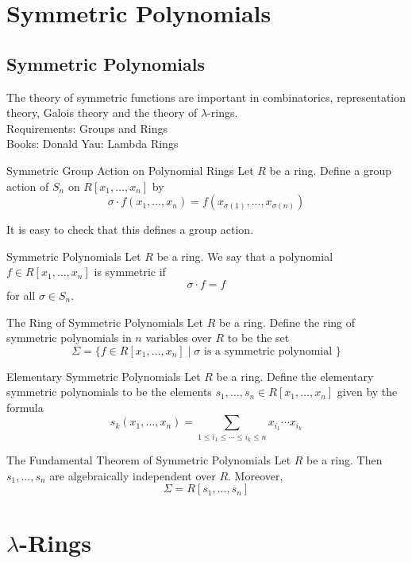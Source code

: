 \documentclass[a4paper]{article}
\begin{document}
\pagebreak
\section{Symmetric Polynomials}
\subsection{Symmetric Polynomials}
The theory of symmetric functions are important in combinatorics, representation theory, Galois theory and the theory of $\lambda$-rings. \\

Requirements: Groups and Rings\\
Books: Donald Yau: Lambda Rings

\begin{defn}{Symmetric Group Action on Polynomial Rings}{} Let $R$ be a ring. Define a group action of $S_n$ on $R[x_1,\dots,x_n]$ by $$\sigma\cdot f(x_1,\dots,x_n)=f(x_{\sigma(1)},\dots,x_{\sigma(n)})$$
\end{defn}

It is easy to check that this defines a group action. 

\begin{defn}{Symmetric Polynomials}{} Let $R$ be a ring. We say that a polynomial $f\in R[x_1,\dots,x_n]$ is symmetric if $$\sigma\cdot f=f$$ for all $\sigma\in S_n$. 
\end{defn}

\begin{defn}{The Ring of Symmetric Polynomials}{} Let $R$ be a ring. Define the ring of symmetric polynomials in $n$ variables over $R$ to be the set $$\Sigma=\{f\in R[x_1,\dots,x_n]\;|\;\sigma\text{ is a symmetric polynomial }\}$$
\end{defn}

\begin{defn}{Elementary Symmetric Polynomials}{} Let $R$ be a ring. Define the elementary symmetric polynomials to be the elements $s_1,\dots,s_n\in R[x_1,\dots,x_n]$ given by the formula $$s_k(x_1,\dots,x_n)=\sum_{1\leq i_1\leq\cdots\leq i_k\leq n}x_{i_1}\cdots x_{i_k}$$
\end{defn}

\begin{thm}{The Fundamental Theorem of Symmetric Polynomials}{} Let $R$ be a ring. Then $s_1,\dots,s_n$ are algebraically independent over $R$. Moreover, $$\Sigma=R[s_1,\dots,s_n]$$
\end{thm}

\pagebreak
\section{$\lambda$-Rings}
\end{document}
